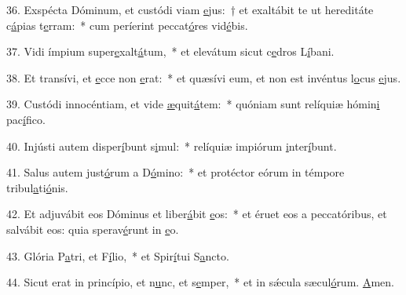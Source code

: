 36. Exspécta Dóminum, et custódi viam \uline{e}jus:~† et exaltábit te ut hereditáte c\uline{á}pias t\uline{e}rram:~* cum períerint peccat\uline{ó}res vid\uline{é}bis.\par 
37. Vidi ímpium super\uline{e}xalt\uline{á}tum,~* et elevátum sicut c\uline{e}dros L\uline{í}bani.\par 
38. Et transívi, et \uline{e}cce non \uline{e}rat:~* et quæsívi eum, et non est invéntus l\uline{o}cus \uline{e}jus.\par 
39. Custódi innocéntiam, et vide \uline{æ}quit\uline{á}tem:~* quóniam sunt relíquiæ hómin\uline{i} pac\uline{í}fico.\par 
40. Injústi autem disper\uline{í}bunt s\uline{i}mul:~* relíquiæ impiórum \uline{i}nter\uline{í}bunt.\par 
41. Salus autem just\uline{ó}rum a D\uline{ó}mino:~* et protéctor eórum in témpore tribul\uline{a}ti\uline{ó}nis.\par 
42. Et adjuvábit eos Dóminus et liber\uline{á}bit \uline{e}os:~* et éruet eos a peccatóribus, et salvábit eos: quia sperav\uline{é}runt in \uline{e}o.\par 
43. Glória P\uline{a}tri, et F\uline{í}lio,~* et Spir\uline{í}tui S\uline{a}ncto.\par 
44. Sicut erat in princípio, et n\uline{u}nc, et s\uline{e}mper,~* et in sǽcula sæcul\uline{ó}rum. \uline{A}men.\par 
